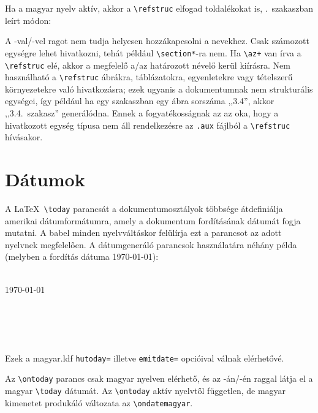\documentclass[12pt]{article}
\begin{document}
Ha a magyar nyelv aktív, akkor a \verb|\refstruc| elfogad toldalékokat is,  .~szakaszban leírt módon:

\begin{latexexample}
\end{latexexample}

A -val/-vel ragot nem tudja helyesen hozzákapcsolni a nevekhez.
Csak számozott egységre lehet hivatkozni, tehát például \verb|\section*|-ra nem.
Ha \verb|\az+| van írva a \verb|\refstruc| elé, akkor a megfelelő a/az határozott névelő kerül kiírásra.
Nem használható a \verb|\refstruc| ábrákra, táblázatokra, egyenletekre vagy tételszerű környezetekre való hivatkozásra; ezek ugyanis a dokumentumnak nem strukturális egységei, így például ha egy szakaszban egy ábra sorszáma ,,3.4'', akkor ,,3.4.~szakasz'' generálódna.
Ennek a fogyatékosságnak az az oka, hogy a hivatkozott egység típusa nem áll rendelkezésre az \texttt{.aux} fájlból a \verb|\refstruc| hívásakor.

\section{Dátumok}\label{sec-datum}

A \LaTeX\ \verb|\today| parancsát a dokumentumosztályok többsége átdefiniálja amerikai dátumformátumra, amely a dokumentum fordításának dátumát fogja mutatni.
A \textsf{babel} minden nyelvváltáskor felülírja ezt a parancsot az adott nyelvnek megfelelően.
A dátumgeneráló parancsok használatára néhány példa (melyben a fordítás dátuma \today):

\begin{latexexample}
\SafeToday\\
\today\\
\\
\\
\ondatemagyar\\
\ontoday\\
\end{latexexample}
Ezek a \textsf{magyar.ldf} \texttt{hutoday=} illetve \texttt{emitdate=} opcióival válnak elérhetővé.

Az \verb|\ontoday| parancs csak magyar nyelven elérhető, és az -án/-én raggal látja el a magyar \verb|\today| dátumát.
Az \verb|\ontoday| aktív nyelvtől független, de magyar kimenetet produkáló változata az \verb|\ondatemagyar|.
\end{document}
